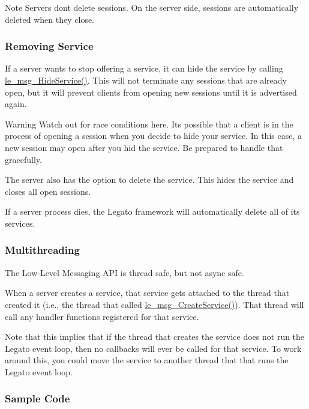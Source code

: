 \begin{DoxyNote}{Note}
Servers don\textquotesingle{}t delete sessions. On the server side, sessions are automatically deleted when they close.
\end{DoxyNote}
\hypertarget{c_messaging_c_messagingRemovingService}{}\subsubsection{Removing Service}\label{c_messaging_c_messagingRemovingService}
If a server wants to stop offering a service, it can hide the service by calling \hyperlink{le__messaging_8h_a38cc9dec16a758c5262d8bb5c7a2e57f}{le\+\_\+msg\+\_\+\+Hide\+Service()}. This will not terminate any sessions that are already open, but it will prevent clients from opening new sessions until it is advertised again.

\begin{DoxyWarning}{Warning}
Watch out for race conditions here. It\textquotesingle{}s possible that a client is in the process of opening a session when you decide to hide your service. In this case, a new session may open after you hid the service. Be prepared to handle that gracefully.
\end{DoxyWarning}
The server also has the option to delete the service. This hides the service and closes all open sessions.

If a server process dies, the Legato framework will automatically delete all of its services.\hypertarget{c_messaging_c_messagingServerMultithreading}{}\subsubsection{Multithreading}\label{c_messaging_c_messagingServerMultithreading}
The Low-\/\+Level Messaging A\+P\+I is thread safe, but not async safe.

When a server creates a service, that service gets attached to the thread that created it (i.\+e., the thread that called \hyperlink{le__messaging_8h_adbbb2737069b636028128c74ae407742}{le\+\_\+msg\+\_\+\+Create\+Service()}). That thread will call any handler functions registered for that service.

Note that this implies that if the thread that creates the service does not run the Legato event loop, then no callbacks will ever be called for that service. To work around this, you could move the service to another thread that that runs the Legato event loop.\hypertarget{c_messaging_c_messagingServerExample}{}\subsubsection{Sample Code}\label{c_messaging_c_messagingServerExample}

